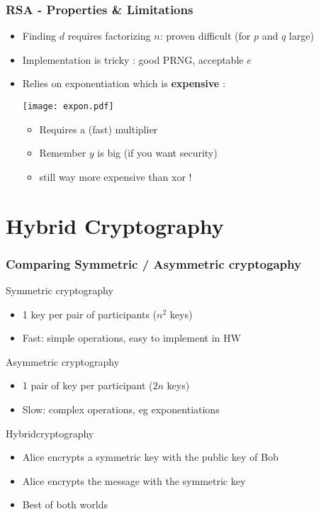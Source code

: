 \documentclass[
hyperref={pdfpagelabels=false}
,xcolor=table
]
{beamer}
\newcommand{\plus}{{\texttt{[image: plus.png]}}}
\newcommand{\minus}{{\texttt{[image: minus.png]}}}
\begin{document}
\begin{frame}
  \frametitle{RSA - Properties \& Limitations}

  \begin{itemize}
  \item[\plus] Finding $d$ requires factorizing $n$: proven difficult (for $p$ and $q$ large)
  \item[\minus] Implementation is tricky : good PRNG, acceptable $e$ 
  \item[\minus] Relies on exponentiation which is \textbf{expensive} :
    \begin{center}
      \texttt{[image: expon.pdf]}
    \end{center}
    \begin{itemize}
    \item Requires a (fast) multiplier
    \item Remember $y$ is big (if you want security)
    \item still way more expensive than xor ! 
    \end{itemize}
  \end{itemize}
\end{frame}


\section{Hybrid Cryptography}

\begin{frame}
  \frametitle{Comparing Symmetric / Asymmetric cryptogaphy}

  \begin{block}{Symmetric cryptography}
    \begin{itemize}
    \item 1 key per pair of participants ($n^2$ keys)
    \item Fast: simple operations, easy to implement in HW
    \end{itemize}
  \end{block}

  \begin{block}{Asymmetric cryptography}
    \begin{itemize}
    \item 1 pair of key per participant ($2n$ keys)
    \item Slow: complex operations, eg exponentiations
    \end{itemize}
  \end{block}


  \begin{block}{Hybridcryptography}
    \begin{itemize}
    \item Alice encrypts a symmetric key with the public key of Bob
    \item Alice encrypts the message with the symmetric key
    \item[$\Rightarrow$] Best of both worlds
    \end{itemize}
  \end{block}
  
\end{frame}
\end{document}
